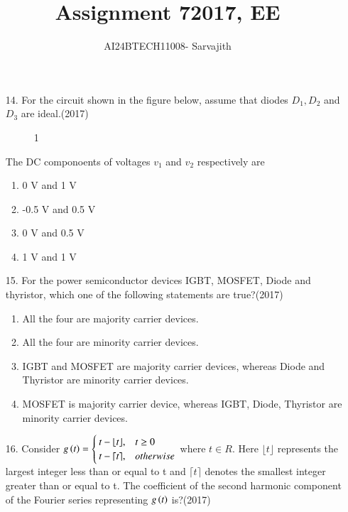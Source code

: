 \documentclass[journal]{IEEEtran}
\begin{document}

\vspace{3cm}


\author{AI24BTECH11008- Sarvajith
}
\title{Assignment 7}
{\let\newpage\relax\maketitle}
\title{2017, EE}
\renewcommand{\thefigure}{\theenumi}
\renewcommand{\thetable}{\theenumi}
\setlength{\intextsep}{10pt} %
\renewcommand{\thetable}{\theenumi}
\begin{enumerate}
    \item[14.] For the circuit shown in the figure below, assume that diodes $D_1, D_2$ and $D_3$ are ideal.\hfill (2017)
    \begin{figure}[!ht]
        \centering
        \caption{1}
    \end{figure}
    The DC componoents of voltages $v_1$ and $v_2$ respectively are
    \begin{enumerate}[label=(\Alph*)]
        \item 0 V and 1 V
        \item -0.5 V and 0.5 V
        \item 0 V and 0.5 V
        \item 1 V and 1 V
    \end{enumerate}
    \item[15.] For the power semiconductor devices IGBT, MOSFET, Diode and thyristor, which one of the following statements are true?\hfill (2017)
    \begin{enumerate}[label=(\Alph*)]
        \item All the four are majority carrier devices.
        \item All the four are minority carrier devices.
        \item IGBT and MOSFET are majority carrier devices, whereas Diode and Thyristor are minority carrier devices.
        \item MOSFET is majority carrier device, whereas IGBT, Diode, Thyristor are minority carrier devices.
    \end{enumerate}
    \item[16.] Consider $g\left(t\right)=\begin{cases}t-\lfloor t \rfloor, & t\geq 0\\ t-\lceil t \rceil, & otherwise \end{cases}$ where $t \in R$. Here $\lfloor t \rfloor$ represents the largest integer less than or equal to t and  $\lceil t \rceil$ denotes the smallest integer greater than or equal to t. The coefficient of the second harmonic component of the Fourier series representing $g\left(t\right)$ is?\hfill (2017)

\end{enumerate}
\end{document}
